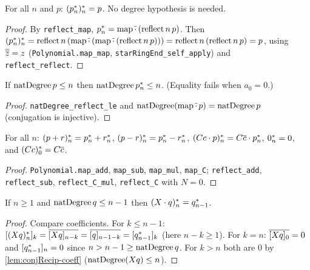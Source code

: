 \begin{lemma}\label{lem:conjRecip-invol}
For all $n$ and $p$: $\crec{n}{(\crec{n}{p})}=p$. No degree hypothesis is needed.
\end{lemma}
\begin{proof}
By \texttt{reflect\_map}, $\crec{n}{p}=\mathrm{map}\,\cj{\cdot}\,(\mathrm{reflect}\,n\,p)$.
Then $\crec{n}{(\crec{n}{p})}=\mathrm{reflect}\,n\,(\mathrm{map}\,\cj\cdot\,(\mathrm{map}\,\cj\cdot\,(\mathrm{reflect}\,n\,p)))
=\mathrm{reflect}\,n\,(\mathrm{reflect}\,n\,p)=p$, using $\cj{\cj z}=z$
(\texttt{Polynomial.map\_map}, \texttt{starRingEnd\_self\_apply}) and
\texttt{reflect\_reflect}.
\end{proof}

\begin{lemma}\label{lem:conjRecip-natDegree}
If $\natdeg\,p\le n$ then $\natdeg\,\crec{n}{p}\le n$. (Equality fails when $a_0=0$.)
\end{lemma}
\begin{proof}
\texttt{natDegree\_reflect\_le} and $\natdeg(\mathrm{map}\,\cj\cdot\,p)=\natdeg\,p$
(conjugation is injective).
\end{proof}

\begin{lemma}\label{lem:conjRecip-linear}
For all $n$: $\crec{n}{(p+r)}=\crec{n}{p}+\crec{n}{r}$,
$\crec{n}{(p-r)}=\crec{n}{p}-\crec{n}{r}$,
$\crec{n}{(C c\cdot p)}=C\cj c\cdot\crec{n}{p}$, $\crec{n}{0}=0$, and
$\crec{0}{(C c)}=C\cj c$.
\end{lemma}
\begin{proof}
\texttt{Polynomial.map\_add}, \texttt{map\_sub}, \texttt{map\_mul}, \texttt{map\_C};
\texttt{reflect\_add}, \texttt{reflect\_sub}, \texttt{reflect\_C\_mul}, \texttt{reflect\_C} with $N=0$.
\end{proof}

\begin{lemma}[shift]\label{lem:conjRecip-X-mul}
If $n\ge1$ and $\natdeg\,q\le n-1$ then $\crec{n}{(X\cdot q)}=\crec{n-1}{q}$.
\end{lemma}
\begin{proof}
Compare coefficients. For $k\le n-1$:
$\coeff{\crec{n}{(Xq)}}{k}=\cj{\coeff{Xq}{n-k}}=\cj{\coeff q{n-1-k}}=\coeff{\crec{n-1}{q}}{k}$
(here $n-k\ge1$). For $k=n$: $\cj{\coeff{Xq}{0}}=0$ and $\coeff{\crec{n-1}q}{n}=0$
since $n>n-1\ge\natdeg\,q$. For $k>n$ both are $0$ by \ref{lem:conjRecip-coeff}
($\natdeg(Xq)\le n$).
\end{proof}

